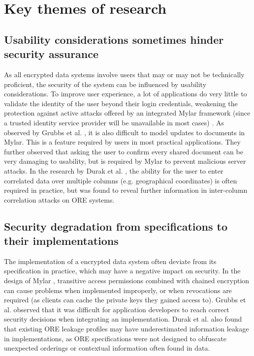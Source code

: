\documentclass[11pt]{article}
\begin{document}
\section{Key themes of research}

\subsection{Usability considerations sometimes hinder security assurance}

As all encrypted data systems involve users that may or may not be technically proficient, the security of the system can be influenced by usability considerations. To improve user experience, a lot of applications do very little to validate the identity of the user beyond their login credentials, weakening the protection against active attacks offered by an integrated Mylar framework (since a trusted identity service provider will be unavailable in most cases) \cite[3.1]{popa2014building}. As observed by Grubbs et al. \cite[3.3]{grubbs2016breaking}, it is also difficult to model updates to documents in Mylar. This is a feature required by users in most practical applications. They further observed \cite[8.1]{grubbs2016breaking} that asking the user to confirm every shared document can be very damaging to usability, but is required by Mylar to prevent malicious server attacks. In the research by Durak et al. \cite[Sec. 3]{durak2016else}, the ability for the user to enter correlated data over multiple columns (e.g. geographical coordinates) is often required in practice, but was found to reveal further information in inter-column correlation attacks on ORE systems.

\subsection{Security degradation from specifications to their implementations}

The implementation of a encrypted data system often deviate from its specification in practice, which may have a negative impact on security. In the design of Mylar \cite[4.1]{popa2014building}, transitive access permissions combined with chained encryption can cause problems when implemented improperly, or when revocations are required (as clients can cache the private keys they gained access to). Grubbs et al. \cite[5.1]{grubbs2016breaking} observed that it was difficult for application developers to reach correct security decisions when integrating an implementation. Durak et al. \cite[Sec. 4]{durak2016else} also found that existing ORE leakage profiles may have underestimated information leakage in implementations, as ORE specifications were not designed to obfuscate unexpected orderings or contextual information often found in data.
\end{document}
